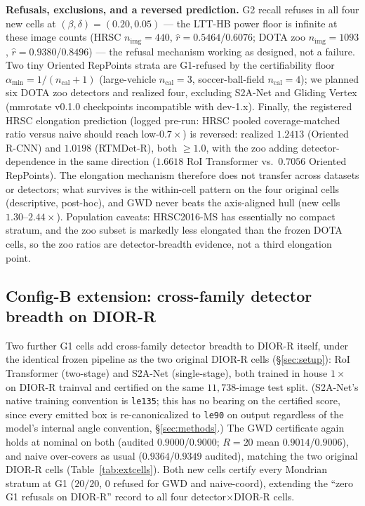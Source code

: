 \documentclass[journal]{IEEEtran}
\begin{document}
\textbf{Refusals, exclusions, and a reversed prediction.} G2 recall refuses in all four new cells at
$(\beta,\delta)=(0.20,0.05)$ --- the LTT-HB power floor is infinite at these image counts (HRSC
$n_{\mathrm{img}}=440$, $\hat r=0.5464$/$0.6076$; DOTA zoo $n_{\mathrm{img}}=1093$, $\hat r=0.9380$/$0.8496$)
--- the refusal mechanism working as designed, not a failure. Two tiny Oriented RepPoints strata are
G1-refused by the certifiability floor $\alpha_{\min}=1/(n_{\mathrm{cal}}+1)$ (large-vehicle
$n_{\mathrm{cal}}=3$, soccer-ball-field $n_{\mathrm{cal}}=4$); we planned six DOTA zoo detectors and realized
four, excluding S2A-Net \citep{han2022s2anet} and Gliding Vertex \citep{xu2021glidingvertex} (mmrotate v0.1.0 checkpoints incompatible with dev-1.x). Finally,
the registered HRSC elongation prediction (logged pre-run: HRSC pooled coverage-matched ratio versus naive
should reach low-$0.7\times$) is reversed: realized $1.2413$ (Oriented R-CNN) and $1.0198$ (RTMDet-R),
both $\ge1.0$, with the zoo adding detector-dependence in the same direction ($1.6618$ RoI Transformer vs.\
$0.7056$ Oriented RepPoints). The elongation mechanism therefore does not transfer across datasets or
detectors; what survives is the within-cell pattern on the four original cells (descriptive,
post-hoc), and GWD never beats the axis-aligned hull (new cells $1.30$--$2.44\times$). Population caveats:
HRSC2016-MS has essentially no compact stratum, and the zoo subset is markedly less elongated than the frozen
DOTA cells, so the zoo ratios are detector-breadth evidence, not a third elongation point.

\subsection{Config-B extension: cross-family detector breadth on DIOR-R}\label{sec:configB}
Two further G1 cells add cross-family detector breadth to DIOR-R itself, under the identical frozen pipeline
as the two original DIOR-R cells (\S\ref{sec:setup}): RoI Transformer (two-stage) and S2A-Net (single-stage),
both trained in house $1\times$ on DIOR-R trainval and certified on the same $11{,}738$-image test split.
(S2A-Net's native training convention is \texttt{le135}; this has no bearing on the certified score, since
every emitted box is re-canonicalized to \texttt{le90} on output regardless of the model's internal angle
convention, \S\ref{sec:methods}.) The GWD certificate again holds at nominal on both (audited
$0.9000$/$0.9000$; $R{=}20$ mean $0.9014$/$0.9006$), and naive over-covers as usual ($0.9364$/$0.9349$
audited), matching the two original DIOR-R cells (Table~\ref{tab:extcells}). Both new cells certify every
Mondrian stratum at G1 ($20/20$, $0$ refused for GWD and naive-coord), extending the ``zero G1 refusals on
DIOR-R'' record to all four detector$\times$DIOR-R cells.
\end{document}
